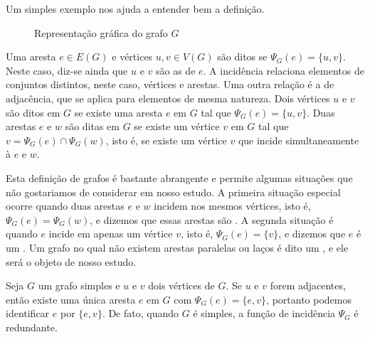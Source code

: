 Um simples exemplo nos ajuda a entender bem a definição.

\begin{figure}
\centering
{}
\caption{Representação gráfica do grafo $G$} \label{fig:grafo}
\end{figure}

Uma aresta $e \in E(G)$ e vértices $u, v \in V(G)$ são ditos  se $\Psi_G(e) = \{u,v\}$. Neste caso, diz-se ainda que $u$ e $v$ são as  de $e$. A incidência relaciona elementos de conjuntos distintos, neste caso, vértices e arestas.
Uma outra relação é a de adjacência, que se aplica para elementos de mesma natureza. Dois vértices $u$ e $v$ são ditos  em $G$ se existe uma aresta $e$ em $G$ tal que $\Psi_G(e) = \{u,v\}$. Duas arestas $e$ e $w$ são ditas  em $G$ se existe um vértice $v$ em $G$ tal que $v = \Psi_G(e) \cap \Psi_G(w)$, isto é, se existe um vértice $v$ que incide simultaneamente à $e$ e $w$.

Esta definição de grafos é bastante abrangente e permite algumas situações que não gostariamos de considerar em nosso estudo. A primeira situação especial ocorre quando duas arestas $e$ e $w$ incidem nos mesmos vértices, isto é, $\Psi_G(e) = \Psi_G(w)$, e dizemos que essas arestas são . A segunda situação é quando $e$ incide em apenas um vértice $v$, isto é, $\Psi_G(e) = \{v\}$, e dizemos que $e$ é um . Um grafo no qual não existem arestas paralelas ou laços é dito um , e ele será o objeto de nosso estudo.

Seja $G$ um grafo simples e $u$ e $v$ dois vértices de $G$. Se $u$ e $v$ forem adjacentes, então existe uma única aresta $e$ em $G$ com $\Psi_G(e) = \{e,v\}$, portanto podemos identificar $e$ por $\{e,v\}$. De fato, quando $G$ é simples, a função de incidência $\Psi_G$ é redundante.



